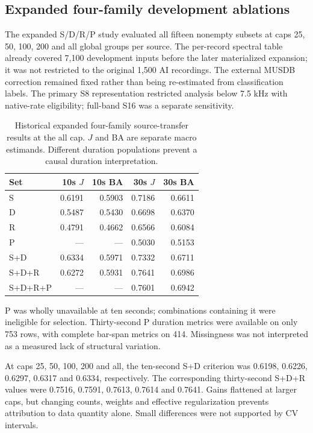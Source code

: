 \subsection{Expanded four-family development ablations}

The expanded S/D/R/P study evaluated all fifteen nonempty subsets at caps
25, 50, 100, 200 and all global groups per source. The per-record spectral
table already covered 7,100 development inputs before the later materialized
expansion; it was not restricted to the original 1,500 AI recordings. The
external MUSDB correction remained fixed rather than being re-estimated from
classification labels. The primary S8 representation restricted analysis below
7.5 kHz with native-rate eligibility; full-band S16 was a separate sensitivity.

\begin{table}[htbp]
\centering\small
\caption{Historical expanded four-family source-transfer results at the all
cap. $J$ and BA are separate macro estimands. Different duration populations
prevent a causal duration interpretation.}
\label{tab:four-family-historical}
\begin{tabular}{lrrrr}
\toprule
Set & 10s $J$ & 10s BA & 30s $J$ & 30s BA\\
\midrule
S & 0.6191 & 0.5903 & 0.7186 & 0.6611\\
D & 0.5487 & 0.5430 & 0.6698 & 0.6370\\
R & 0.4791 & 0.4662 & 0.6566 & 0.6084\\
P & --- & --- & 0.5030 & 0.5153\\
S+D & 0.6334 & 0.5971 & 0.7332 & 0.6711\\
S+D+R & 0.6272 & 0.5931 & 0.7641 & 0.6986\\
S+D+R+P & --- & --- & 0.7601 & 0.6942\\
\bottomrule
\end{tabular}
\end{table}

P was wholly unavailable at ten seconds; combinations containing it were
ineligible for selection. Thirty-second P duration metrics were available on
only 753 rows, with complete bar-span metrics on 414. Missingness was not
interpreted as a measured lack of structural variation.

At caps 25, 50, 100, 200 and all, the ten-second S+D criterion was
0.6198, 0.6226, 0.6297, 0.6317 and 0.6334, respectively. The corresponding
thirty-second S+D+R values were 0.7516, 0.7591, 0.7613, 0.7614 and 0.7641.
Gains flattened at larger caps,
but changing counts, weights and effective regularization prevents attribution
to data quantity alone. Small differences were not supported by CV intervals.

